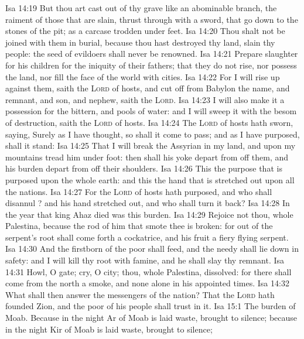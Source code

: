 \vs Isa 14:19 But thou art cast out of thy grave like an abominable branch,  the raiment of those that are slain, thrust through with a sword, that go down to the stones of the pit; as a carcase trodden under feet.
\vs Isa 14:20 Thou shalt not be joined with them in burial, because thou hast destroyed thy land,  slain thy people: the seed of evildoers shall never be renowned.
\vs Isa 14:21 Prepare slaughter for his children for the iniquity of their fathers; that they do not rise, nor possess the land, nor fill the face of the world with cities.
\vs Isa 14:22 For I will rise up against them, saith the \textsc{Lord} of hosts, and cut off from Babylon the name, and remnant, and son, and nephew, saith the \textsc{Lord}.
\vs Isa 14:23 I will also make it a possession for the bittern, and pools of water: and I will sweep it with the besom of destruction, saith the \textsc{Lord} of hosts.
\vs Isa 14:24 The \textsc{Lord} of hosts hath sworn, saying, Surely as I have thought, so shall it come to pass; and as I have purposed,  shall it stand:
\vs Isa 14:25 That I will break the Assyrian in my land, and upon my mountains tread him under foot: then shall his yoke depart from off them, and his burden depart from off their shoulders.
\vs Isa 14:26 This  the purpose that is purposed upon the whole earth: and this  the hand that is stretched out upon all the nations.
\vs Isa 14:27 For the \textsc{Lord} of hosts hath purposed, and who shall disannul ? and his hand  stretched out, and who shall turn it back?
\vs Isa 14:28 In the year that king Ahaz died was this burden.
\vs Isa 14:29 Rejoice not thou, whole Palestina, because the rod of him that smote thee is broken: for out of the serpent's root shall come forth a cockatrice, and his fruit  a fiery flying serpent.
\vs Isa 14:30 And the firstborn of the poor shall feed, and the needy shall lie down in safety: and I will kill thy root with famine, and he shall slay thy remnant.
\vs Isa 14:31 Howl, O gate; cry, O city; thou, whole Palestina,  dissolved: for there shall come from the north a smoke, and none  alone in his appointed times.
\vs Isa 14:32 What shall  then answer the messengers of the nation? That the \textsc{Lord} hath founded Zion, and the poor of his people shall trust in it.
\vs Isa 15:1 The burden of Moab. Because in the night Ar of Moab is laid waste,  brought to silence; because in the night Kir of Moab is laid waste,  brought to silence;
